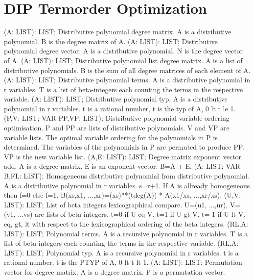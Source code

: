 \section{ DIP Termorder Optimization  } 
 (A: LIST): LIST; \eproc
\bcom Distributive polynomial degree matrix. A is a distributive
polynomial. B is the degree matrix of A.  \ecom 
{} (A: LIST): LIST; \eproc
\bcom Distributive polynomial degree vector. A is a distributive
polynomial. N is the degree vector of A. \ecom 
{} (A: LIST): LIST; \eproc
\bcom Distributive polynomial list degree matrix. A is a list of
distributive polynomials. B is the sum of all degree matrices
of each element of A.  \ecom 
{} (A: LIST): LIST; \eproc
\bcom Distributive polynomial terms. A is a distributive polynomial
in r variables. T is a list of beta-integers each counting
the terms in the respective variable. \ecom 
{} (A: LIST): LIST; \eproc
\bcom Distributive polynomial typ. A is a distributive polynomial
in r variables. t is a rational number, t is the typ of A,
0 lt t le 1.  \ecom 
{} (P,V: LIST; VAR PP,VP: LIST); \eproc
\bcom Distributive polynomial variable ordering optimisation.
P and PP are lists of distributive polynomials.
V and VP are variable lists. The optimal variable ordering
for the polynomials in P is determined. The variables
of the polynomials in P are permuted to produce PP.
VP is the new variable list. \ecom 
{} (A,E: LIST): LIST; \eproc
\bcom Degree matrix exponent vector add. A is a degree matrix.
E is an exponent vector. B=A + E.  \ecom 
{} (A: LIST; VAR B,FL: LIST); \eproc
\bcom Homogeneous distributive polynomial from distributive polynomial.
A is a distributive polynomial in r variables. s=r+1.
If A is allready homogeneous then f=0 else f=1.
B(xs,x1, ...,xr)=(xs)**(tdeg(A)) * A(x1/xs, ...,xr/xs).  \ecom 
{} (U,V: LIST): LIST; \eproc
\bcom List of beta integers lexicographical compare.
U=(u1, ...,ur), V=(v1, ...vs) are lists of beta integers.
t=0 if U eq V. t=1 if U gt V. t=-1 if U lt V. eq, gt,
lt with respect to the lexicographical ordering of the
beta integers.  \ecom 
{} (RL,A: LIST): LIST; \eproc
\bcom Polynomial terms. A is a recursive polynomial in r
variables. T is a list of beta-integers each counting the
terms in the respective variable. \ecom 
{} (RL,A: LIST): LIST; \eproc
\bcom Polynomial typ. A is a recursive polynomial in r variables.
t is a rational number, t is the PTYP of A, 0 lt t lt 1.  \ecom 
{} (A: LIST): LIST; \eproc
\bcom Permutation vector for degree matrix. A is a degree matrix.
P is a permutation vector.  \ecom 

